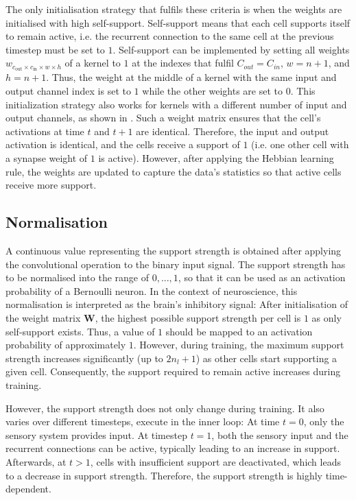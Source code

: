 The only initialisation strategy that fulfils these criteria is when the weights are initialised with high self-support.
Self-support means that each cell supports itself to remain active, i.e. the recurrent connection to the same cell at the previous timestep must be set to $1$.
Self-support can be implemented by setting all weights $w_{c_{\text{out}} \times c_{\text{in}} \times w \times h}$ of a kernel to $1$ at the indexes that fulfil 
$C_{out} = C_{in}$, $w = n+1$, and $h = n+1$. Thus, the weight at the middle of a kernel with the same input and output channel index is set to $1$ while the other weights are set to $0$. This initialization strategy also works for kernels with a different number of input and output channels, as shown in .
Such a weight matrix ensures that the cell's activations at time $t$ and $t+1$ are identical. Therefore, the input and output activation is identical, and the cells receive a support of $1$ (i.e. one other cell with a synapse weight of $1$ is active).
However, after applying the Hebbian learning rule, the weights are updated to capture the data's statistics so that active cells receive more support.

\subsection{Normalisation}
A continuous value representing the support strength is obtained after applying the convolutional operation to the binary input signal.
The support strength has to be normalised into the range of $0, ..., 1$, so that it can be used as an activation probability of a Bernoulli neuron.
In the context of neuroscience, this normalisation is interpreted as the brain's inhibitory signal:
After initialisation of the weight matrix $\boldsymbol{W}$, the highest possible support strength per cell is $1$ as only self-support exists. Thus, a value of $1$ should be mapped to an activation probability of approximately $1$. However, during training, the maximum support strength  increases significantly (up to $2n_l + 1$) as other cells start supporting a given cell.
Consequently, the support required to remain active increases during training.

However, the support strength does not only change during training. It also varies over different timesteps, execute in the inner loop: At time $t=0$, only the sensory system provides input. At timestep $t=1$, both the sensory input and the recurrent connections can be active, typically leading to an increase in support. Afterwards, at $t>1$, cells with insufficient support are deactivated, which leads to a decrease in support strength. Therefore, the support strength is highly time-dependent.

